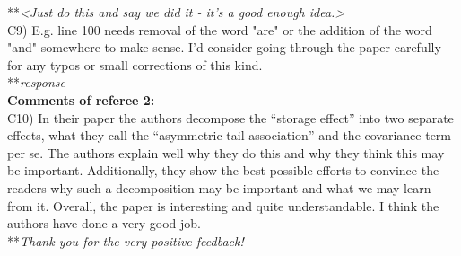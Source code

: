 \documentclass[letterpaper,11pt]{article}
\begin{document}
\noindent ***\emph{<Just do this and say we did it - it's a good enough idea.>} \\

\noindent C9) E.g. line 100 needs removal of the word "are" or the addition of the word "and" somewhere to make sense. I'd consider going through the paper carefully for any typos or small corrections of this kind. \\

\noindent ***\emph{response} \\

\noindent \textbf{Comments of referee 2:} \\

\noindent C10) In their paper the authors decompose the “storage effect” into two separate effects, what they call the “asymmetric tail association” and the covariance term per se. The authors explain well why they do this and why they think this may be important. Additionally, they show the best possible efforts to convince the readers why such a decomposition may be important and what we may learn from it. Overall, the paper is interesting and quite understandable. I think the authors have done a very good job. \\

\noindent ***\emph{Thank you for the very positive feedback!} \\
\end{document}
